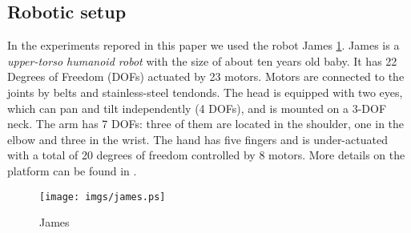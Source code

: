 \subsection{Robotic setup}
In the experiments repored in this paper we used the robot James 
\ref{figJames}. James is a \textit{upper-torso humanoid robot} with the 
size of about ten years old baby. It has 22 Degrees of Freedom (DOFs) 
actuated by 23 motors. Motors are connected to the joints by belts and 
stainless-steel tendonds. The head is equipped with two eyes, which 
can pan and tilt independently (4 DOFs), and is mounted on a 3-DOF 
neck. The arm has 7 DOFs: three of them are located in the shoulder, 
one in the elbow and three in the wrist. The hand has five fingers 
and is under-actuated with a total of 20 degrees of freedom controlled 
by 8 motors. More details on the platform can be found in \cite{JHRAUW06-12}.

\begin{figure}
\centering
\texttt{[image: imgs/james.ps]}
\caption{James}
\label{figJames}
\end{figure}
